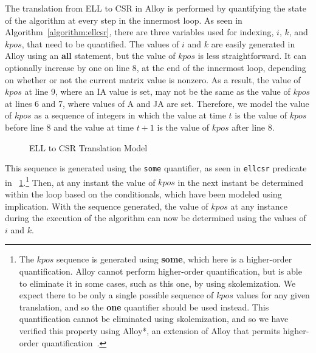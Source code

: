 The translation from ELL to CSR in Alloy is performed by quantifying the state of the algorithm at every step in the innermost loop.  As seen in Algorithm~\ref{algorithm:ellcsr}, there are three variables used for indexing, $i$, $k$, and $kpos$, that need to be quantified.  The values of $i$ and $k$ are easily generated in Alloy using an \textbf{all} statement, but the value of $kpos$ is less straightforward.
It can optionally increase by one on line 8, at the end of the innermost loop, depending on whether or not the current matrix value is nonzero.
As a result, the value of $kpos$ at line 9, where an IA value is set, may not be the same as the value of $kpos$ at lines 6 and 7, where values of A and JA are set.
Therefore, we model the value of $kpos$ as a sequence of integers in which the value at time $t$ is the value of $kpos$ before line 8 and the value at time $t+1$ is the value of $kpos$ after line 8.

\begin{figure}

\caption{ELL to CSR Translation Model}
\label{model:ellcsr}
\end{figure}

This sequence is generated using the \texttt{some} quantifier, as seen in \texttt{ellcsr} predicate in \figurename~\ref{model:ellcsr}.\footnote{The $kpos$ sequence is generated using \textbf{some}, which here is a higher-order quantification.  Alloy cannot perform higher-order quantification, but is able to eliminate it in some cases, such as this one, by using skolemization.  We expect there to be only a single possible sequence of $kpos$ values for any given translation, and so the \textbf{one} quantifier should be used instead.  This quantification cannot be eliminated using skolemization, and so we have verified this property using Alloy*, an extension of Alloy that permits higher-order quantification~\cite{alloy*}.}  Then, at any instant the value of $kpos$ in the next instant be determined within the loop based on the conditionals, which have been modeled using implication.  With the sequence generated, the value of $kpos$ at any instance during the execution of the algorithm can now be determined using the values of $i$ and $k$.

